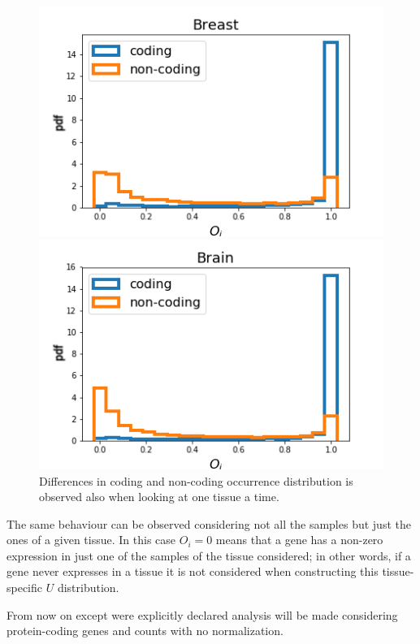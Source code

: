 \begin{figure}[htb!]
    \centering
    \begin{minipage}{0.45\textwidth}
    \includegraphics[width=0.95\linewidth]{pictures/structure/gtex/U_Breast.png}
    \end{minipage}
    \hspace{2mm}
    \begin{minipage}{0.45\textwidth}
    \includegraphics[width=0.95\linewidth]{pictures/structure/gtex/U_Brain.png}
    \end{minipage}
    \caption{Differences in coding and non-coding occurrence distribution is observed also when looking at one tissue a time.}
    \label{fig:structure/gtex/U_tissues}
\end{figure}

The same behaviour can be observed considering not all the samples but just the ones of a given tissue. In this case $O_i=0$ means that a gene has a non-zero expression in just one of the samples of the tissue considered; in other words, if a gene never expresses in a tissue it is not considered when constructing this tissue-specific $U$ distribution.

From now on except were explicitly declared analysis will be made considering protein-coding genes and counts with no normalization.